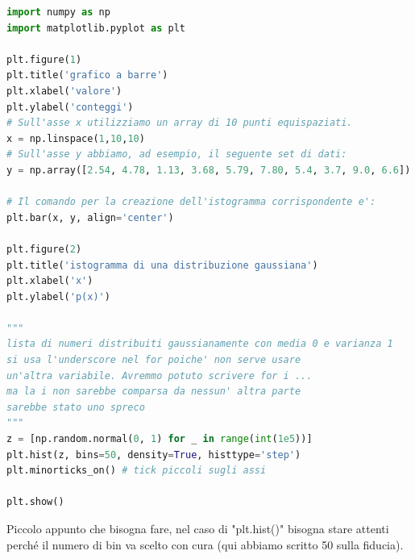 \documentclass[10pt,a4paper]{article}
\begin{document}
\begin{lstlisting}[language=Python]
import numpy as np
import matplotlib.pyplot as plt

plt.figure(1)
plt.title('grafico a barre')
plt.xlabel('valore')
plt.ylabel('conteggi')
# Sull'asse x utilizziamo un array di 10 punti equispaziati.
x = np.linspace(1,10,10)
# Sull'asse y abbiamo, ad esempio, il seguente set di dati:
y = np.array([2.54, 4.78, 1.13, 3.68, 5.79, 7.80, 5.4, 3.7, 9.0, 6.6])

# Il comando per la creazione dell'istogramma corrispondente e':
plt.bar(x, y, align='center')

plt.figure(2)
plt.title('istogramma di una distribuzione gaussiana')
plt.xlabel('x')
plt.ylabel('p(x)')

"""
lista di numeri distribuiti gaussianamente con media 0 e varianza 1
si usa l'underscore nel for poiche' non serve usare
un'altra variabile. Avremmo potuto scrivere for i ...
ma la i non sarebbe comparsa da nessun' altra parte
sarebbe stato uno spreco
"""
z = [np.random.normal(0, 1) for _ in range(int(1e5))]
plt.hist(z, bins=50, density=True, histtype='step')
plt.minorticks_on() # tick piccoli sugli assi

plt.show()
\end{lstlisting}
Piccolo appunto che bisogna fare, nel caso di "plt.hist()" bisogna stare attenti perché il numero di bin va scelto con cura (qui abbiamo scritto 50 sulla fiducia).  
\end{document}
